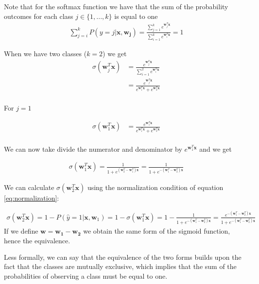 \documentclass[a4paper]{article}
\begin{document}
Note that for the softmax function we have that the sum of the probability outcomes for each class $j \in \{1,...,k\}$ is equal to one
\begin{align} \label{eq:normalization}
    \sum_{j=i}^{k} P(y=j | \mathbf{x}, \mathbf{w_j}) =
    \frac{\sum^k_{j=1}e^{\mathbf{w}^T_j\mathbf{x}}}{\sum^k_{i=1}e^{\mathbf{w}^T_i\mathbf{x}}} =
    1
\end{align}

When we have two classes ($k = 2$) we get
\begin{align*}
\sigma(\mathbf{w}^T_j\mathbf{x}) &= \frac{e^{\mathbf{w}^T_j\mathbf{x}}}{\sum^2_{i=1}e^{\mathbf{w}^T_i\mathbf{x}}} \\
&= \frac{e^{\mathbf{w}^T_j\mathbf{x}}}{e^{\mathbf{w}^T_1\mathbf{x}} + e^{\mathbf{w}^T_2\mathbf{x}}} \\
\end{align*}

For $j = 1$

\begin{align*}
\sigma(\mathbf{w}^T_1\mathbf{x}) &= \frac{e^{\mathbf{w}^T_1\mathbf{x}}}{e^{\mathbf{w}^T_1\mathbf{x}} + e^{\mathbf{w}^T_2\mathbf{x}}} \\
\end{align*}

We can now take divide the numerator and denominator by $e^{\mathbf{w}^T_1\mathbf{x}}$ and we get

\begin{align*}
\sigma(\mathbf{w}^T_1\mathbf{x}) = \frac{1}{1 + e^{(\mathbf{w}^T_2-\mathbf{w}^T_1)\mathbf{x}}} 
= \frac{1}{1 + e^{- (\mathbf{w}^T_1-\mathbf{w}^T_2)\mathbf{x}}}
\end{align*}

We can calculate $\sigma(\mathbf{w}^T_2\mathbf{x})$ using the normalization condition of equation \ref{eq:normalization}:

\begin{align*}
\sigma(\mathbf{w}^T_2\mathbf{x}) = 1 - P(\hat{y} = 1 | \mathbf{x},\mathbf{w}_1) = 1 - \sigma(\mathbf{w}^T_1\mathbf{x}) = 1 - \frac{1}{1 + e^{- (\mathbf{w}^T_1-\mathbf{w}^T_2)\mathbf{x}}} = \frac{e^{- (\mathbf{w}^T_1-\mathbf{w}^T_2)\mathbf{x}}}{1 + e^{- (\mathbf{w}^T_1-\mathbf{w}^T_2)\mathbf{x}}}
\end{align*}
If we define $\mathbf{w} = \mathbf{w_1} - \mathbf{w_2}$ we obtain the same form of the sigmoid function, hence the equivalence.

Less formally, we can say that the equivalence of the two forms builds upon the fact that the classes are mutually exclusive, which implies that the sum of the probabilities of observing a class must be equal to one.
\end{document}
